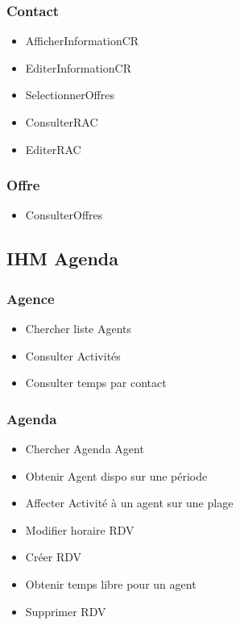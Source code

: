 \subsubsection{Contact}
\begin{itemize}
\item AfficherInformationCR
\item EditerInformationCR
\item SelectionnerOffres
\item ConsulterRAC
\item EditerRAC
\end{itemize}

\subsubsection{Offre}
\begin{itemize}
\item ConsulterOffres
\end{itemize}

\subsection{IHM Agenda}


    \subsubsection{Agence}
    
        \begin{itemize}
            \item Chercher liste Agents
            \item Consulter Activités
            \item Consulter temps par contact
        \end{itemize}

    \subsubsection{Agenda}

        \begin{itemize}
            \item Chercher Agenda Agent
            \item Obtenir Agent dispo sur une période
            \item Affecter Activité à un agent sur une plage
            \item Modifier horaire RDV
            \item Créer RDV
            \item Obtenir temps libre pour un agent
            \item Supprimer RDV
        \end{itemize}

